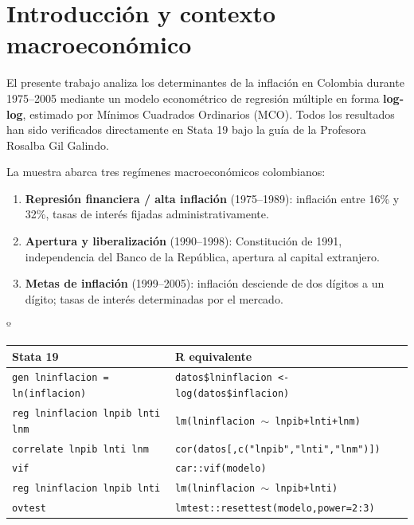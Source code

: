 \documentclass[12pt,a4paper]{article}
\begin{document}
\tableofcontents
\newpage

\section{Introducción y contexto macroeconómico}

El presente trabajo analiza los determinantes de la inflación en Colombia durante
1975--2005 mediante un modelo econométrico de regresión múltiple en forma
\textbf{log-log}, estimado por Mínimos Cuadrados Ordinarios (MCO). Todos los
resultados han sido verificados directamente en Stata 19 bajo la guía de la
Profesora Rosalba Gil Galindo.

La muestra abarca tres regímenes macroeconómicos colombianos:

\begin{enumerate}[noitemsep]
  \item \textbf{Represión financiera / alta inflación} (1975--1989): inflación entre 16\%
        y 32\%, tasas de interés fijadas administrativamente.
  \item \textbf{Apertura y liberalización} (1990--1998): Constitución de 1991,
        independencia del Banco de la República, apertura al capital extranjero.
  \item \textbf{Metas de inflación} (1999--2005): inflación desciende de dos dígitos
        a un dígito; tasas de interés determinadas por el mercado.
\end{enumerate}

\begin{notabox}º
\begin{tabular}{ll}
\toprule
\textbf{Stata 19} & \textbf{R equivalente}\\
\midrule
\texttt{gen lninflacion = ln(inflacion)} & \texttt{datos\$lninflacion <- log(datos\$inflacion)}\\
\texttt{reg lninflacion lnpib lnti lnm} & \texttt{lm(lninflacion $\sim$ lnpib+lnti+lnm)}\\
\texttt{correlate lnpib lnti lnm} & \texttt{cor(datos[,c("lnpib","lnti","lnm")])}\\
\texttt{vif} & \texttt{car::vif(modelo)}\\
\texttt{reg lninflacion lnpib lnti} & \texttt{lm(lninflacion $\sim$ lnpib+lnti)}\\
\texttt{ovtest} & \texttt{lmtest::resettest(modelo,power=2:3)}\\
\bottomrule
\end{tabular}
\end{notabox}
\end{document}
